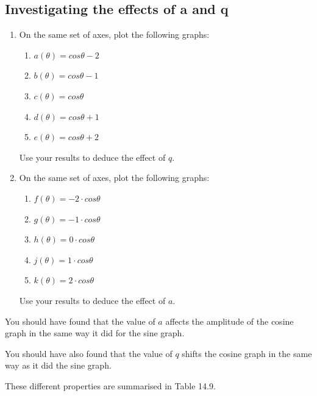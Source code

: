 \subsection*{Investigating the effects of a and q}
\nopagebreak
\begin{enumerate}[noitemsep, label=\textbf{\arabic*}. ] 
\item On the same set of axes, plot the following graphs:
\begin{enumerate}[noitemsep, label=\textbf{\alph*}. ] 
\item $a(\theta )=cos\theta -2$
\item $b(\theta )=cos\theta -1$
\item $c(\theta )=cos\theta $
\item $d(\theta )=cos\theta +1$
\item $e(\theta )=cos\theta +2$\end{enumerate}
Use your results to deduce the effect of $q$.
\item On the same set of axes, plot the following graphs:
\begin{enumerate}[noitemsep, label=\textbf{\alph*}. ] 
\item $f(\theta )=-2\ensuremath{\cdot}cos\theta $
\item $g(\theta )=-1\ensuremath{\cdot}cos\theta $
\item $h(\theta )=0\ensuremath{\cdot}cos\theta $
\item $j(\theta )=1\ensuremath{\cdot}cos\theta $
\item $k(\theta )=2\ensuremath{\cdot}cos\theta $\end{enumerate}
Use your results to deduce the effect of $a$.
\end{enumerate}
You should have found that the value of $a$ affects the amplitude of the cosine graph in the same way it did for the sine graph.\par 
You should have also found that the value of $q$ shifts the cosine graph in the same way as it did the sine graph.\par 
These different properties are summarised in Table 14.9.\par 
